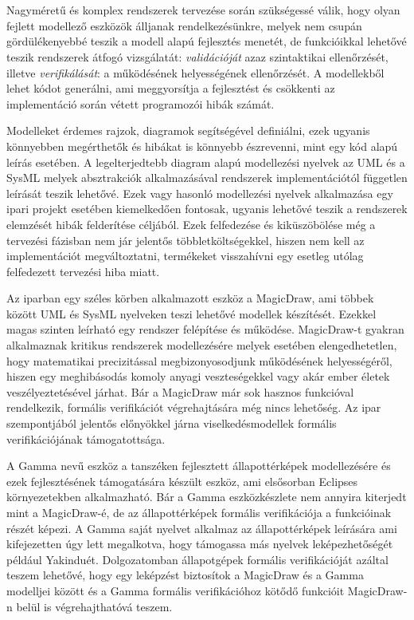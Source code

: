 \chapter{\bevezetes}


Nagyméretű és komplex rendszerek tervezése során szükségessé válik, hogy olyan fejlett modellező eszközök álljanak rendelkezésünkre, melyek nem csupán gördülékenyebbé teszik a modell alapú fejlesztés menetét, de funkcióikkal lehetővé teszik rendszerek átfogó vizsgálatát: \emph{validációját} azaz szintaktikai ellenőrzését, illetve \emph{verifikálását}: a működésének helyességének ellenőrzését. A modellekből lehet kódot generálni, ami meggyorsítja a fejlesztést és csökkenti az implementáció során vétett programozói hibák számát.

Modelleket érdemes rajzok, diagramok segítségével definiálni, ezek ugyanis könnyebben megérthetők és hibákat is könnyebb észrevenni, mint egy kód alapú leírás esetében. A legelterjedtebb diagram alapú modellezési nyelvek az UML és a SysML melyek absztrakciók alkalmazásával rendszerek implementációtól független leírását teszik lehetővé. Ezek vagy hasonló modellezési nyelvek alkalmazása egy ipari projekt esetében kiemelkedően fontosak, ugyanis lehetővé teszik a rendszerek elemzését hibák felderítése céljából. Ezek felfedezése és kiküszöbölése még a tervezési fázisban nem jár jelentős többletköltségekkel, hiszen nem kell az implementációt megváltoztatni, termékeket visszahívni egy esetleg utólag felfedezett tervezési hiba miatt.

Az iparban egy széles körben alkalmazott eszköz a MagicDraw, ami többek között UML és SysML nyelveken teszi lehetővé modellek készítését. Ezekkel magas szinten leírható egy rendszer felépítése és működése. MagicDraw-t gyakran alkalmaznak kritikus rendszerek modellezésére melyek esetében elengedhetetlen, hogy matematikai precizitással megbizonyosodjunk működésének helyességéről, hiszen egy meghibásodás komoly anyagi veszteségekkel vagy akár ember életek veszélyeztetésével járhat. Bár a MagicDraw már sok hasznos funkcióval rendelkezik, formális verifikációt végrehajtására még nincs lehetőség. Az ipar szempontjából jelentős előnyökkel járna viselkedésmodellek formális verifikációjának támogatottsága.

A Gamma nevű eszköz a tanszéken fejlesztett állapottérképek modellezésére és ezek fejlesztésének támogatására készült eszköz, ami elsősorban Eclipses környezetekben alkalmazható. Bár a Gamma eszközkészlete nem annyira kiterjedt mint a MagicDraw-é, de az állapottérképek formális verifikációja a funkcióinak részét képezi. A Gamma saját nyelvet alkalmaz az állapottérképek leírására ami kifejezetten úgy lett megalkotva, hogy támogassa más nyelvek leképezhetőségét például Yakinduét. Dolgozatomban állapotgépek formális verifikációját azáltal teszem lehetővé, hogy egy leképzést biztosítok a MagicDraw és a Gamma modelljei között és a Gamma formális verifikációhoz kötődő funkcióit MagicDraw-n belül is végrehajthatóvá teszem.

